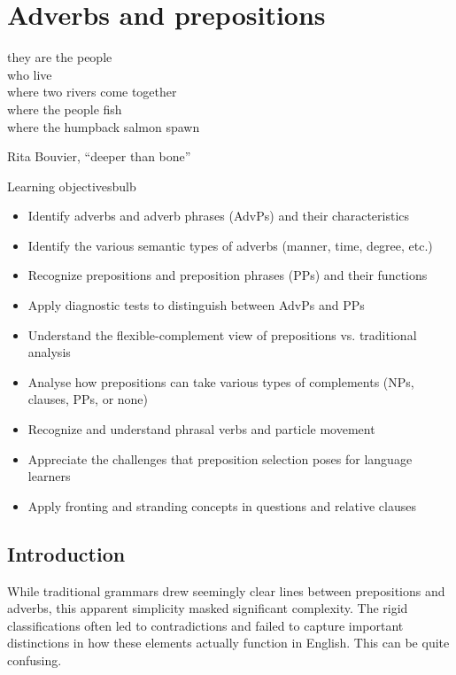 \chapter{Adverbs and prepositions}

\epigraph{they are the people\\
who live\\
\phantom{~~~~}where two rivers come together\\
\phantom{~~~~}where the people fish\\
\phantom{~~~~}where the humpback salmon spawn}{Rita Bouvier, \enquote{deeper than bone}}

\begin{tblsframedsymbol}{Learning objectives}{bulb}
\begin{itemize}[noitemsep, leftmargin=*]
    \item Identify adverbs and adverb phrases (AdvPs) and their characteristics
    \item Identify the various semantic types of adverbs (manner, time, degree, etc.)
    \item Recognize prepositions and preposition phrases (PPs) and their functions
    \item Apply diagnostic tests to distinguish between AdvPs and PPs
    \item Understand the flexible-complement view of prepositions vs. traditional analysis
    \item Analyse how prepositions can take various types of complements (NPs, clauses, PPs, or none)
    \item Recognize and understand phrasal verbs and particle movement
    \item Appreciate the challenges that preposition selection poses for language learners
    \item Apply fronting and stranding concepts in questions and relative clauses
\end{itemize}
\end{tblsframedsymbol}

\section{Introduction} 
While traditional grammars drew seemingly clear lines between prepositions and adverbs, this apparent simplicity masked significant complexity. The rigid classifications often led to contradictions and failed to capture important distinctions in how these elements actually function in English. This can be quite confusing.

